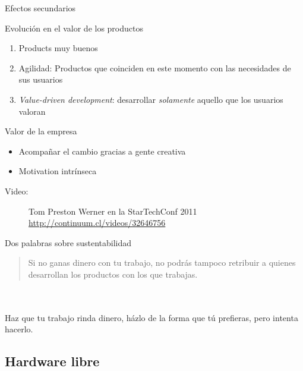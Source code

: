   \begin{frame}{Efectos secundarios}
    \begin{block}{Evolución en el valor de los productos}
      \begin{enumerate}
        \item Products muy buenos
        \item Agilidad: Productos que coinciden \alert{en este momento} con las necesidades de sus usuarios
        \item \emph{Value-driven development}: desarrollar \emph{solamente} aquello que los usuarios valoran
      \end{enumerate}
    \end{block}
    \begin{block}{Valor de la empresa}
      \begin{itemize}
        \item Acompañar el cambio gracias a gente creativa
        \item Motivation intrínseca \cite{pink2011drive}
      \end{itemize}
    \end{block}
    \begin{description}
      \item[Video:] Tom Preston Werner en la StarTechConf 2011 \url{http://continuum.cl/videos/32646756}
    \end{description}
  \end{frame}  

  \begin{frame}{Dos palabras sobre sustentabilidad}
      \hspace{.9em}\vspace{-1.4em}
      \begin{quote}
        Si no ganas dinero con tu trabajo, no podrás tampoco retribuir a quienes desarrollan los productos con los que trabajas.\hspace{.5em}
      \end{quote}\\~\\ \vfill
      Haz que tu trabajo rinda dinero, házlo de la forma que tú prefieras, pero intenta hacerlo.
  \end{frame}

%
\subsection{Hardware libre}

